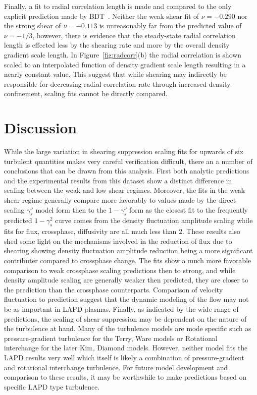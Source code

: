 \documentclass[aip,pop,amsmath,amssymb,reprint,superscriptaddress]{revtex4-1} %
\begin{document}
Finally, a fit to radial correlation length is made and compared to the only explicit prediction made by BDT~\cite{biglari90}. Neither the weak shear fit of $\nu = -0.290$ nor the strong shear of $\nu = -0.113$ is unreasonably far from the predicted value of $\nu = -1/3$, however, there is evidence that the steady-state radial correlation length is effected less by the shearing rate and more by the overall density gradient scale length. In Figure~\ref{fig:radcorr}(b) the radial correlation is shown scaled to an interpolated function of density gradient scale length resulting in a nearly constant value. This suggest that while shearing may indirectly be responsible for decreasing radial correlation rate through increased density confinement, scaling fits cannot be directly compared.

\section{Discussion}

While the large variation in shearing suppression scaling fits for upwards of six turbulent quantities makes very careful verification difficult, there an a number of conclusions that can be drawn from this analysis. First both analytic predictions and the experimental results from this dataset show a distinct difference in scaling between the weak and low shear regimes. Moreover, the fits in the weak shear regime generally compare more favorably to values made by the direct scaling $\gamma_{s}^{\nu}$ model form then to the $1-\gamma_{s}^{\nu}$ form as the closest fit to the frequently predicted $1-\gamma_{s}^{2}$ curve comes from the density fluctuation amplitude scaling while fits for flux, crossphase, diffusivity are all much less than 2. These results also shed some light on the mechanisms involved in the reduction of flux due to shearing showing density fluctuation amplitude reduction being a more significant contributer compared to crossphase change. The fits show a much more favorable comparison to weak crossphase scaling predictions then to strong, and while density amplitude scaling are generally weaker then predicted, they are closer to the prediction than the crossphase counterparts. Comparison of velocity fluctuation to prediction suggest that the dynamic modeling of the flow may not be as important in LAPD plasmas. Finally, as indicated by the wide range of predictions, the scaling of shear suppression may be dependent on the nature of the turbulence at hand. Many of the turbulence models are mode specific such as pressure-gradient turbulence for the Terry, Ware models or Rotational interchange for the later Kim, Diamond models. However, neither model fits the LAPD results very well which itself is likely a combination of pressure-gradient and rotational interchange turbulence. For future model development and comparison to these results, it may be worthwhile to make predictions based on specific LAPD type turbulence.
\end{document}
